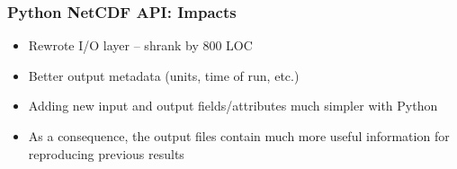 \documentclass[red, hyperref={pdfpagelabels=false}]{beamer}
\begin{document}
\begin{frame}
  \frametitle{Python NetCDF API: Impacts}
  \begin{itemize}
    \item Rewrote I/O layer -- shrank by 800 LOC
    \item Better output metadata (units, time of run, etc.)
    \item Adding new input and output fields/attributes much simpler with Python
    \item As a consequence, the output files contain much more useful
      information for reproducing previous results
  \end{itemize}
\end{frame}


\end{document}
